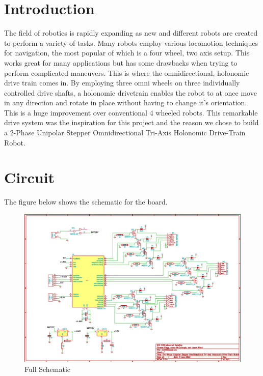 \section{Introduction}

The field of robotics is rapidly expanding as new and different robots are created to perform a variety of tasks. Many robots employ various locomotion techniques for navigation, the most popular of which is a four wheel, two axis setup. This works great for many applications but has some drawbacks when trying to perform complicated maneuvers. This is where the omnidirectional, holonomic drive train comes in. By employing three omni wheels on three individually controlled drive shafts, a holonomic drivetrain enables the robot to at once move in any direction and rotate in place without having to change it’s orientation. This is a huge improvement over conventional 4 wheeled robots. This remarkable drive system was the inspiration for this project and the reason we chose to build a 2-Phase Unipolar Stepper Omnidirectional Tri-Axis Holonomic Drive-Train Robot.

\section{Circuit}

The figure below shows the schematic for the board.

\begin{figure}[H]
    \begin{center}
        \includegraphics[width=.99\textwidth]{images/ece533board.eps}
    \end{center}
    \caption{Full Schematic}
    \label{figure:schematic}
\end{figure}

